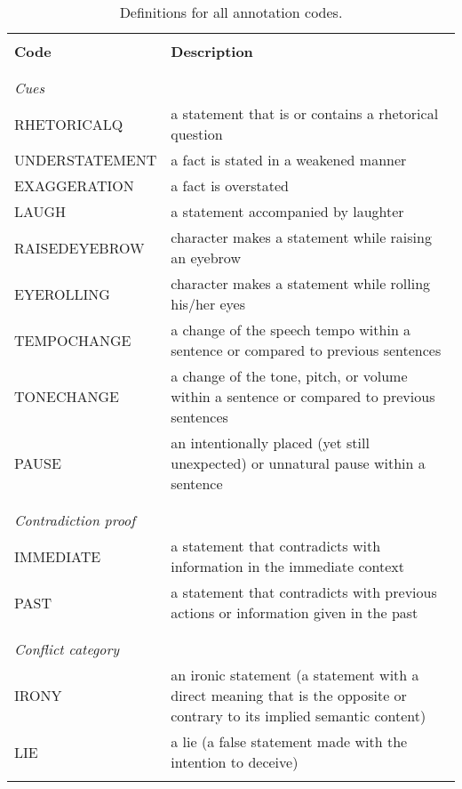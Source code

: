 \documentclass[10pt,a4paper]{article}
\begin{document}
\begin{table*}
  \centering
  \begin{tabular}{lp{10cm}}
    \toprule\\
    \textbf{Code} & \textbf{Description} \\
    \\\midrule\\
    \textit{Cues}\\
    RHETORICALQ & a statement that is or contains a rhetorical question \\
    UNDERSTATEMENT & a fact is stated in a weakened manner \\
    EXAGGERATION & a fact is overstated \\
    LAUGH & a statement accompanied by laughter \\
    RAISEDEYEBROW & character makes a statement while raising an eyebrow \\
    EYEROLLING & character makes a statement while rolling his/her eyes \\
    TEMPOCHANGE & a change of the speech tempo within a sentence or compared to previous sentences\\
    TONECHANGE & a change of the tone, pitch, or volume within a sentence or compared to previous sentences \\
    PAUSE & an intentionally placed (yet still unexpected) or unnatural pause within a sentence \\
    \\\midrule\\
    \textit{Contradiction proof}\\
    IMMEDIATE & a statement that contradicts with information in the immediate context \\
    PAST &  a statement that contradicts with previous actions or information given in the past\\
    \\\midrule\\
    \textit{Conflict category}\\
    IRONY & an ironic statement (a statement with a direct meaning that is the opposite
            or contrary to its implied semantic content)\\
    LIE & a lie (a false statement made with the intention to deceive)\\
    \\\bottomrule
  \end{tabular}
  \caption{Definitions for all annotation codes.}
  \label{tab:annotationcodes}
\end{table*}
\end{document}
